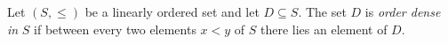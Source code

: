 \begin{definition}
\label{def:order-dense-subset}
Let $(S,\leq)$ be a linearly ordered set and let $D\subseteq S$.  The set
$D$ is \emph{order dense in} $S$ if between every two elements $x<y$ of
$S$ there lies an element of $D$.
\end{definition}